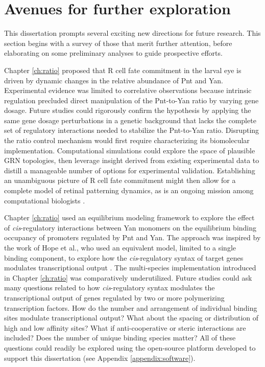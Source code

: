 \section{Avenues for further exploration}

This dissertation prompts several exciting new directions for future research. This section begins with a survey of those that merit further attention, before elaborating on some preliminary analyses to guide prospective efforts.

Chapter \ref{ch:ratio} proposed that R cell fate commitment in the larval eye is driven by dynamic changes in the relative abundance of Pnt and Yan. Experimental evidence was limited to correlative observations because intrinsic regulation precluded direct manipulation of the Pnt-to-Yan ratio by varying gene dosage. Future studies could rigorously confirm the hypothesis by applying the same gene dosage perturbations in a genetic background that lacks the complete set of regulatory interactions needed to stabilize the Pnt-to-Yan ratio. Disrupting the ratio control mechanism would first require characterizing its biomolecular implementation. Computational simulations could explore the space of plausible GRN topologies, then leverage insight derived from existing experimental data to distill a manageable number of options for experimental validation. Establishing an unambiguous picture of R cell fate commitment might then allow for a complete model of retinal patterning dynamics, as is an ongoing mission among computational biologists \cite{Lubensky2011,Gavish2016}.

Chapter \ref{ch:ratio} used an equilibrium modeling framework to explore the effect of \textit{cis}-regulatory interactions between Yan monomers on the equilibrium binding occupancy of promoters regulated by Pnt and Yan. The approach was inspired by the work of Hope et al., who used an equivalent model, limited to a single binding component, to explore how the \textit{cis}-regulatory syntax of target genes modulates transcriptional output \cite{Hope2017}. The multi-species implementation introduced in Chapter \ref{ch:ratio} was comparatively underutilized. Future studies could ask many questions related to how \textit{cis}-regulatory syntax modulates the transcriptional output of genes regulated by two or more polymerizing transcription factors. How do the number and arrangement of individual binding sites modulate transcriptional output? What about the spacing or distribution of high and low affinity sites? What if anti-cooperative or steric interactions are included? Does the number of unique binding species matter? All of these questions could readily be explored using the open-source platform developed to support this dissertation (see Appendix \ref{appendix:software}).

